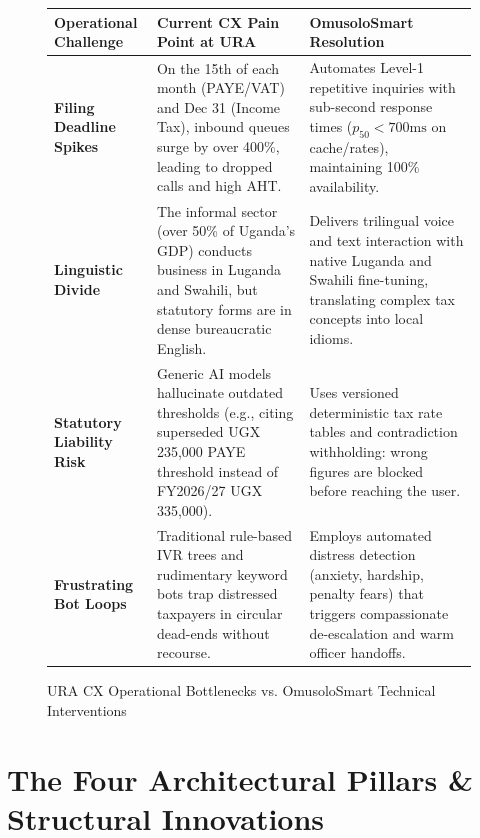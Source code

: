 \documentclass[10pt,a4paper]{article}
\begin{document}
\begin{figure}[h!]
\centering
\small
\begin{tabularx}{\textwidth}{l X X}
\toprule
\textbf{Operational Challenge} & \textbf{Current CX Pain Point at URA} & \textbf{OmusoloSmart Resolution} \\
\midrule
\textbf{Filing Deadline Spikes} & On the 15th of each month (PAYE/VAT) and Dec 31 (Income Tax), inbound queues surge by over 400\%, leading to dropped calls and high AHT. & Automates Level-1 repetitive inquiries with sub-second response times ($p_{50} < 700\text{ms}$ on cache/rates), maintaining 100\% availability. \\
\addlinespace
\textbf{Linguistic Divide} & The informal sector (over 50\% of Uganda's GDP) conducts business in Luganda and Swahili, but statutory forms are in dense bureaucratic English. & Delivers trilingual voice and text interaction with native Luganda and Swahili fine-tuning, translating complex tax concepts into local idioms. \\
\addlinespace
\textbf{Statutory Liability Risk} & Generic AI models hallucinate outdated thresholds (e.g., citing superseded UGX 235,000 PAYE threshold instead of FY2026/27 UGX 335,000). & Uses versioned deterministic tax rate tables and contradiction withholding: wrong figures are blocked before reaching the user. \\
\addlinespace
\textbf{Frustrating Bot Loops} & Traditional rule-based IVR trees and rudimentary keyword bots trap distressed taxpayers in circular dead-ends without recourse. & Employs automated distress detection (anxiety, hardship, penalty fears) that triggers compassionate de-escalation and warm officer handoffs. \\
\bottomrule
\end{tabularx}
\caption{URA CX Operational Bottlenecks vs. OmusoloSmart Technical Interventions}
\end{figure}

\section{The Four Architectural Pillars \& Structural Innovations}
\end{document}
